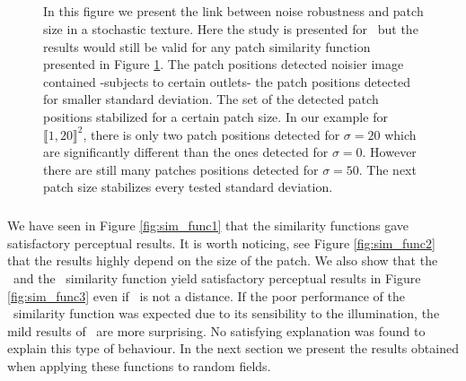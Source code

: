   \begin{figure}[H]
    \centering
   \hfill
   \hfill
   \hfill \\
   \hfill 
   \hfill
   \hfill \\
   \hfill
   \hfill
   \hfill \\
   \hfill
   \hfill
   \hfill \\
  \caption{In this figure we present the link between noise robustness and patch size in a stochastic texture. Here the study is presented for  \ but the results would still be valid for any patch similarity function presented in Figure \ref{fig:noise_general}. The patch positions detected noisier image contained -subjects to certain outlets- the patch positions detected for smaller standard deviation. The set of the detected patch positions stabilized for a certain patch size. In our example for $\llbracket 1,20 \rrbracket^2$, there is only two patch positions detected for $\sigma = 20$ which are significantly different than the ones detected for $\sigma = 0$. However there are still many patches positions detected for $\sigma = 50$. The next patch size stabilizes every tested standard deviation.}
  \label{fig:noise_general}
\end{figure}


  \subparagraph{} We have seen in Figure \ref{fig:sim_func1} that the similarity functions gave satisfactory perceptual results. It is worth noticing, see Figure \ref{fig:sim_func2} that the results highly depend on the size of the patch. We also show that the  \ and the \scos \ similarity function yield satisfactory perceptual results in Figure \ref{fig:sim_func3} even if \scos \ is not a distance. If the poor performance of the \sps \ similarity function was expected due to its sensibility to the illumination, the mild results of \s{\infty} \ are more surprising. No satisfying explanation was found to explain this type of behaviour. In the next section we present the results obtained when applying these functions to random fields.

